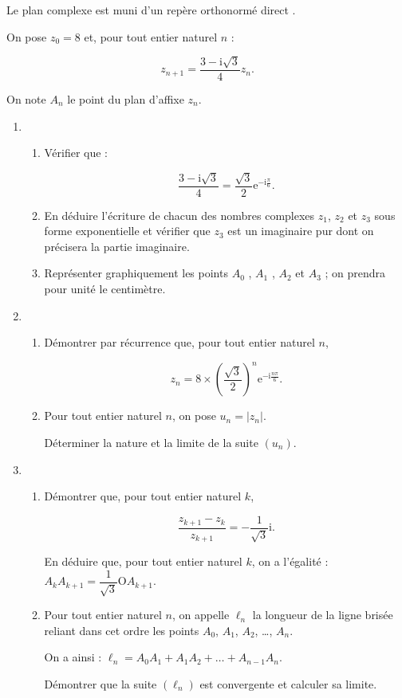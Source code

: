 \documentclass{cornouaille}
\begin{document}
\begin{exercice}
Le plan complexe est muni d'un repère orthonormé direct \Ouv.

On pose $z_0 = 8$ et, pour tout entier naturel $n$ :

\[z_{n+1} = \dfrac{3 - \text{i}\sqrt{3}}{4}z_n.\]

On note $A_n$ le point du plan d'affixe $z_n$.

\medskip

\begin{enumerate}
\item 
	\begin{enumerate}
		\item Vérifier que :
		
\[\dfrac{3 - \text{i}\sqrt{3}}{4} = \dfrac{\sqrt{3}}{2}\text{e}^{- \text{i}\frac{\pi}{6}}.\]
		
		\item En déduire l'écriture de chacun des nombres complexes $z_1$,  $z_2$ et $z_3$ sous forme exponentielle et vérifier que $z_3$ est un imaginaire pur dont on précisera la partie imaginaire.
		\item Représenter graphiquement les points $A_0$ , $A_1$ , $A_2$ et $A_3$ ; on prendra pour unité le centimètre.
 	\end{enumerate}
\item
	\begin{enumerate}
		\item Démontrer par récurrence que, pour tout entier naturel $n$,
		
\[z_n = 8 \times \left(\dfrac{\sqrt{3}}{2}\right)^n \text{e}^{- \text{i}\frac{n\pi}{6}}.\]
		
		\item Pour tout entier naturel $n$, on pose $u_n = \left|z_n\right|$.
		
Déterminer la nature et la limite de la suite $\left(u_n\right)$.
	\end{enumerate}
\item 
	\begin{enumerate}
		\item Démontrer que, pour tout entier naturel $k$,
		
		\[\dfrac{z_{k+1} - z_{k}}{z_{k+1}} = - \dfrac{1}{\sqrt{3}}\text{i}.\]

En déduire que, pour tout entier naturel $k$, on a l'égalité : $A_kA_{k+1} = \dfrac{1}{\sqrt{3}} \text{O}A_{k+1}$.
		\item Pour tout entier naturel $n$, on appelle $\ell_n$ la longueur de la ligne brisée reliant dans cet ordre les points $A_0$,\: $A_1$,\: $A_2$, \ldots , $A_n$.
		
On a ainsi : $\ell_n = A_0A_1 + A_1A_2 + \ldots + A_{n-1}A_n$.
		
Démontrer que la suite $\left(\ell_n\right)$ est convergente et calculer sa limite.
	\end{enumerate}
\end{enumerate}
\end{exercice}
\end{document}
